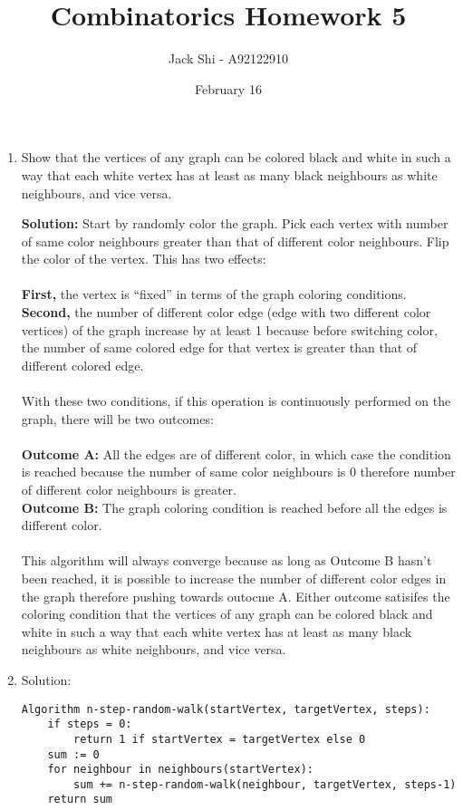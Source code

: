 \documentclass{article}
\title{Combinatorics Homework 5}
\author{Jack Shi - A92122910}
\date{February 16}
\begin{document}
\maketitle

\begin{enumerate} [label=(\textbf{\arabic*})]
	\item Show that the vertices of any graph can be colored black and white in
		such a way that each white vertex has at least as many black neighbours as
		white neighbours, and vice versa.

		\textbf{Solution: }Start by randomly color the graph. Pick each vertex with
		number of same color neighbours greater than that of different color
		neighbours. Flip the color of the vertex. This has two effects: \\\\
		\textbf{First,} the vertex is ``fixed'' in terms of the graph coloring conditions.\\
		\textbf{Second,} the number of different color edge (edge with two different color
		vertices) of the graph increase by at least 1 because before switching
		color, the number of same colored edge for that vertex is greater than that
		of different colored edge. \\\\
		With these two conditions, if this operation is continuously
		performed on the graph, there will be two outcomes:\\\\
		\textbf{Outcome A: }All the edges are of different color, in which case the
		condition is reached because the number of same color neighbours is 0
		therefore number of different color neighbours is greater.\\
		\textbf{Outcome B: }The graph coloring condition is reached before all the
		edges is different color.\\\\
		This algorithm will always converge because as long as Outcome B hasn't been
		reached, it is possible to increase the number of different color edges in
		the graph therefore pushing towards outocme A. Either outcome satisifes the
		coloring condition that the vertices of any graph can be colored black and
		white in such a way that each white vertex has at least as many black
		neighbours as white neighbours, and vice versa.

	\item Solution:
	\begin{lstlisting}
Algorithm n-step-random-walk(startVertex, targetVertex, steps):
	if steps = 0:
		return 1 if startVertex = targetVertex else 0
	sum := 0
	for neighbour in neighbours(startVertex):
		sum += n-step-random-walk(neighbour, targetVertex, steps-1)
	return sum
	\end{lstlisting}


\end{enumerate}
\end{document}
